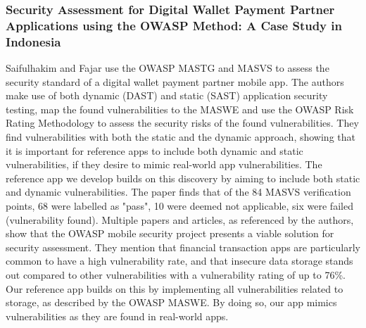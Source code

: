 \subsubsection{Security Assessment for Digital Wallet Payment Partner Applications using the OWASP Method: A Case Study in Indonesia}
Saifulhakim and Fajar \citep{paper_02} use the OWASP MASTG and MASVS to assess the security standard of a digital wallet payment partner mobile app. The authors make use of both dynamic (DAST) and static (SAST) application security testing, map the found vulnerabilities to the MASWE and use the OWASP Risk Rating Methodology to assess the security risks of the found vulnerabilities. They find vulnerabilities with both the static and the dynamic approach, showing that it is important for reference apps to include both dynamic and static vulnerabilities, if they desire to mimic real-world app vulnerabilities. The reference app we develop builds on this discovery by aiming to include both static and dynamic vulnerabilities. The paper finds that of the 84 MASVS verification points, 68 were labelled as "pass", 10 were deemed not applicable, six were failed (vulnerability found). Multiple papers and articles, as referenced by the authors, show that the OWASP mobile security project presents a viable solution for security assessment. They mention that financial transaction apps are particularly common to have a high vulnerability rate, and that insecure data storage stands out compared to other vulnerabilities with a vulnerability rating of up to 76\%.  Our reference app builds on this by implementing all vulnerabilities related to storage, as described by the OWASP MASWE. By doing so, our app mimics vulnerabilities as they are found in real-world apps.

